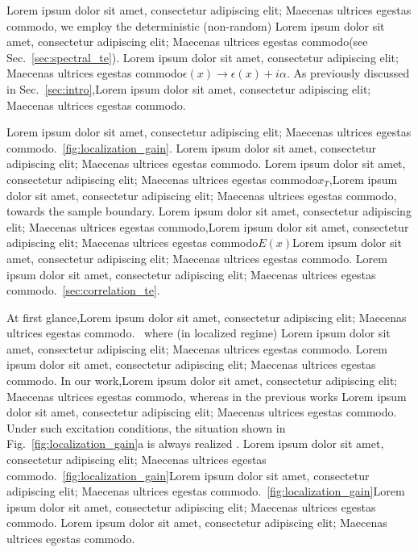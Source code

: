 Lorem ipsum dolor sit amet, consectetur adipiscing elit; Maecenas ultrices egestas commodo, we employ the deterministic (non-random) Lorem ipsum dolor sit amet, consectetur adipiscing elit; Maecenas ultrices egestas commodo(see Sec.~\ref{sec:spectral_te}). Lorem ipsum dolor sit amet, consectetur adipiscing elit; Maecenas ultrices egestas commodo$\epsilon(x)\rightarrow\epsilon(x)+i\alpha$. As previously discussed in Sec.~\ref{sec:intro},Lorem ipsum dolor sit amet, consectetur adipiscing elit; Maecenas ultrices egestas commodo.

Lorem ipsum dolor sit amet, consectetur adipiscing elit; Maecenas ultrices egestas commodo.~\ref{fig:localization_gain}. Lorem ipsum dolor sit amet, consectetur adipiscing elit; Maecenas ultrices egestas commodo. Lorem ipsum dolor sit amet, consectetur adipiscing elit; Maecenas ultrices egestas commodo$x_T$,Lorem ipsum dolor sit amet, consectetur adipiscing elit; Maecenas ultrices egestas commodo, towards the sample boundary. Lorem ipsum dolor sit amet, consectetur adipiscing elit; Maecenas ultrices egestas commodo,Lorem ipsum dolor sit amet, consectetur adipiscing elit; Maecenas ultrices egestas commodo$E(x)$Lorem ipsum dolor sit amet, consectetur adipiscing elit; Maecenas ultrices egestas commodo. Lorem ipsum dolor sit amet, consectetur adipiscing elit; Maecenas ultrices egestas commodo.~\ref{sec:correlation_te}. 

At first glance,Lorem ipsum dolor sit amet, consectetur adipiscing elit; Maecenas ultrices egestas commodo.~\cite{2002_Jiang_Loc_Modes_Lasing,2002_Sebbah_Vanneste,2005_Vanneste} where (in localized regime) Lorem ipsum dolor sit amet, consectetur adipiscing elit; Maecenas ultrices egestas commodo. Lorem ipsum dolor sit amet, consectetur adipiscing elit; Maecenas ultrices egestas commodo. In our work,Lorem ipsum dolor sit amet, consectetur adipiscing elit; Maecenas ultrices egestas commodo, whereas in the previous works \cite{2002_Jiang_Loc_Modes_Lasing,2002_Sebbah_Vanneste,2005_Vanneste}Lorem ipsum dolor sit amet, consectetur adipiscing elit; Maecenas ultrices egestas commodo. Under such excitation conditions, the situation shown in Fig.~\ref{fig:localization_gain}a is always realized \cite{2010_Payne_loc_criterion}. Lorem ipsum dolor sit amet, consectetur adipiscing elit; Maecenas ultrices egestas commodo.~\ref{fig:localization_gain}Lorem ipsum dolor sit amet, consectetur adipiscing elit; Maecenas ultrices egestas commodo.~\ref{fig:localization_gain}Lorem ipsum dolor sit amet, consectetur adipiscing elit; Maecenas ultrices egestas commodo. Lorem ipsum dolor sit amet, consectetur adipiscing elit; Maecenas ultrices egestas commodo.

